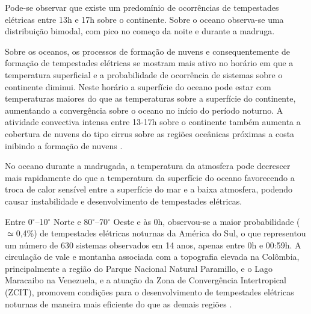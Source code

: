 Pode-se observar que existe um predomínio de ocorrências de tempestades elétricas entre 13h e 17h sobre o continente. Sobre o oceano observa-se  uma distribuição bimodal, com pico no começo da noite e durante a madruga.


Sobre os oceanos, os processos de formação de nuvens e consequentemente de formação de tempestades elétricas se mostram mais ativo no horário em que a temperatura superficial e a probabilidade de ocorrência de sistemas sobre o continente  diminui. Neste horário a superfície do oceano pode estar com temperaturas maiores do que as temperaturas sobre a superfície do continente, aumentando a convergência sobre o oceano no início do período noturno. A atividade convectiva intensa entre 13-17h sobre o continente também aumenta a cobertura de nuvens do tipo cirrus sobre as regiões oceânicas próximas a costa inibindo a formação de nuvens \cite{nesbitt2003diurnal}.

No oceano durante a madrugada, a temperatura da atmosfera pode decrescer mais rapidamente do que a temperatura da superfície do oceano favorecendo a troca de calor sensível entre a superfície do mar e a baixa atmosfera, podendo causar instabilidade e desenvolvimento de tempestades elétricas.


Entre 0$^{\circ}$--10$^{\circ}$ Norte e 80$^{\circ}$--70$^{\circ}$ Oeste e às 0h, observou-se a maior probabilidade ($\simeq$0,4\%) de tempestades elétricas noturnas da América do Sul, o que representou um número de 630 sistemas observados em 14 anos, apenas entre 0h e 00:59h. A circulação de vale e montanha associada com a topografia elevada na Colômbia, principalmente a região do Parque Nacional Natural Paramillo, e o Lago Maracaibo na Venezuela, e a atuação da Zona de Convergência Intertropical (ZCIT), promovem condições para o desenvolvimento de tempestades elétricas noturnas de maneira mais eficiente do que as demais regiões \cite{burgesser2012}.

